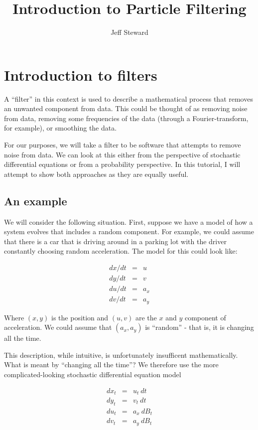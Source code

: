 \documentclass{article}
\author{Jeff Steward}
\title{Introduction to Particle Filtering}
\begin{document}
\maketitle

\section{Introduction to filters}

A ``filter'' in this context is used to describe a mathematical process 
that removes an unwanted component from data.  This could be thought of as 
removing noise from data, removing some frequencies of the data (through a 
Fourier-transform, for example), or smoothing the data.

For our purposes, we will take a filter to be software that attempts 
to remove noise from data.  We can look at this either from the perspective
of stochastic differential equations or from a probability perspective.  In 
this tutorial, I will attempt to show both approaches as they are equally 
useful.

\subsection{An example}

We will consider the following situation.  First, suppose we have a model of how
a system evolves that includes a random component.  For example, we could assume
that there is a car that is driving around in a parking lot with the driver 
constantly choosing random acceleration.  The model for this could look like:

\[ \begin{array}{rcl}
dx/dt & = & u \\
dy/dt & = & v \\
du/dt & = & a_x \\
dv/dt & = & a_y
\end{array}\] 

Where $(x,y)$ is the position and $(u,v)$ are the $x$ and $y$ component of
acceleration.  We could assume that $(a_x,a_y)$ is ``random'' - that is, it
is changing all the time.  

This description, while intuitive, is unfortunately insufficent mathematically.
What is meant by ``changing all the time''?  We therefore use the more 
complicated-looking stochastic differential equation model

\[\begin{array}{rcl}
dx_t & = & u_t~dt \\
dy_t & = & v_t~dt \\
du_t & = & a_x~dB_t \\
dv_t & = & a_y~dB_t
\end{array}\]
\end{document}
